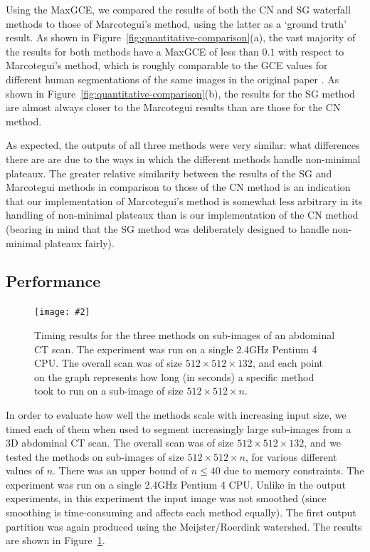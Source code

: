 \documentclass[preprint,a4paper]{elsarticle}
\newcommand{\stufigex}[5]					%
{
	\begin{figure}[#5]
	\begin{center}
		\texttt{[image: \#2]}
		\caption{#3}
		\label{#4}
	\end{center}
	\end{figure}
}
\begin{document}
Using the MaxGCE, we compared the results of both the CN and SG waterfall methods to those of Marcotegui's method, using the latter as a `ground truth' result. As shown in Figure~\ref{fig:quantitative-comparison}(a), the vast majority of the results for both methods have a MaxGCE of less than $0.1$ with respect to Marcotegui's method, which is roughly comparable to the GCE values for different human segmentations of the same images in the original paper \cite{martin01}. As shown in Figure~\ref{fig:quantitative-comparison}(b), the results for the SG method are almost always closer to the Marcotegui results than are those for the CN method.

As expected, the outputs of all three methods were very similar: what differences there are are due to the ways in which the different methods handle non-minimal plateaux. The greater relative similarity between the results of the SG and Marcotegui methods in comparison to those of the CN method is an indication that our implementation of Marcotegui's method is somewhat less arbitrary in its handling of non-minimal plateaux than is our implementation of the CN method (bearing in mind that the SG method was deliberately designed to handle non-minimal plateaux fairly).

\subsection{Performance}
\label{subsec:experiments-performance}

\stufigex{width=.95\linewidth}{timings.png}{Timing results for the three methods on sub-images of an abdominal CT scan. The experiment was run on a single 2.4GHz Pentium 4 CPU. The overall scan was of size $512 \times 512 \times 132$, and each point on the graph represents how long (in seconds) a specific method took to run on a sub-image of size $512 \times 512 \times n$.}{fig:timings}{!t}

In order to evaluate how well the methods scale with increasing input size, we timed each of them when used to segment increasingly large sub-images from a 3D abdominal CT scan\footnotemark{}. The overall scan was of size $512 \times 512 \times 132$, and we tested the methods on sub-images of size $512 \times 512 \times n$, for various different values of $n$. There was an upper bound of $n \le 40$ due to memory constraints. The experiment was run on a single 2.4GHz Pentium 4 CPU. Unlike in the output experiments, in this experiment the input image was not smoothed (since smoothing is time-consuming and affects each method equally). The first output partition was again produced using the Meijster/Roerdink watershed. The results are shown in Figure~\ref{fig:timings}.
\end{document}
